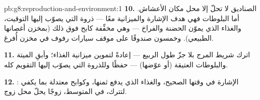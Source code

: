 \begin{solution}{pb:g8:reproduction-and-environment:1}
\textbf{10.} الصناديق لا تحلّ إلا محل مكان الأعشاش. أما البلوطات
فهي هدف الإشارة والميزانية معًا --- ذروة  التي يصوّب إليها
التوقيت، والغذاء الذي يموّن الحضنة والفراخ --- وهي مخفِّفة كابح
فوق ذلك (بمخزن أغصانها الطبيعي). وخمسون صندوقًا على موقف سيارات
رفوف في مخزن أُفرغ.

\textbf{11.} اترك شريط المرج بلا جزّ طول الربيع --- إعادةً لتموين
ميزانية الغذاء؛ وأبقِ  الميتة والبلوطات العتيقة (أو
عوّضها) --- حفظًا  وللذروة التي يصوّب إليها التقويم كله.

\textbf{12.} : الإشارة في وقتها الصحيح، والغذاء الذي يدفع
ثمنها، وكوابح معتدلة بما يكفي لتترك، في المتوسط، زوجًا يحلّ محل
زوج.
\end{solution}
